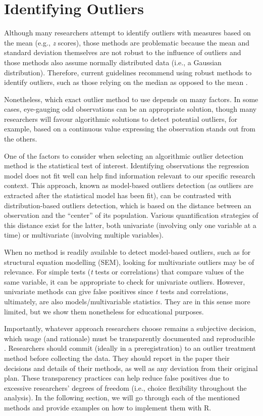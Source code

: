 \documentclass[sn-basic, lineno,pdflatex]{sn-jnl}
\begin{document}
\section{Identifying Outliers}\label{identifying-outliers}

Although many researchers attempt to identify outliers with measures
based on the mean (e.g., \emph{z} scores), those methods are problematic
because the mean and standard deviation themselves are not robust to the
influence of outliers and those methods also assume normally distributed
data (i.e., a Gaussian distribution). Therefore, current guidelines
recommend using robust methods to identify outliers, such as those
relying on the median as opposed to the mean
\citep{leys2019outliers, leys2013outliers, leys2018outliers}.

Nonetheless, which exact outlier method to use depends on many factors.
In some cases, eye-gauging odd observations can be an appropriate
solution, though many researchers will favour algorithmic solutions to
detect potential outliers, for example, based on a continuous value
expressing the observation stands out from the others.

One of the factors to consider when selecting an algorithmic outlier
detection method is the statistical test of interest. Identifying
observations the regression model does not fit well can help find
information relevant to our specific research context. This approach,
known as model-based outliers detection (as outliers are extracted after
the statistical model has been fit), can be contrasted with
distribution-based outliers detection, which is based on the distance
between an observation and the ``center'' of its population. Various
quantification strategies of this distance exist for the latter, both
univariate (involving only one variable at a time) or multivariate
(involving multiple variables).

When no method is readily available to detect model-based outliers, such
as for structural equation modelling (SEM), looking for multivariate
outliers may be of relevance. For simple tests (\emph{t} tests or
correlations) that compare values of the same variable, it can be
appropriate to check for univariate outliers. However, univariate
methods can give false positives since \emph{t} tests and correlations,
ultimately, are also models/multivariable statistics. They are in this
sense more limited, but we show them nonetheless for educational
purposes.

Importantly, whatever approach researchers choose remains a subjective
decision, which usage (and rationale) must be transparently documented
and reproducible \citep{leys2019outliers}. Researchers should commit
(ideally in a preregistration) to an outlier treatment method before
collecting the data. They should report in the paper their decisions and
details of their methods, as well as any deviation from their original
plan. These transparency practices can help reduce false positives due
to excessive researchers' degrees of freedom (i.e., choice flexibility
throughout the analysis). In the following section, we will go through
each of the mentioned methods and provide examples on how to implement
them with R.
\end{document}

